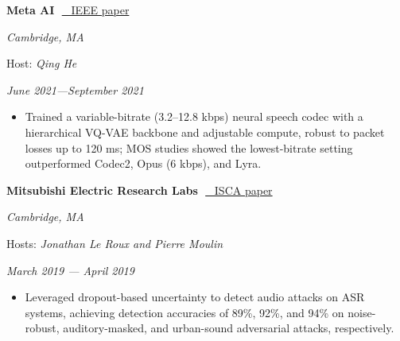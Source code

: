 \documentclass[10pt,margin,centered]{res}
\newcommand\quelle[1]{{%
      \unskip\nobreak\hfil\penalty50
      \hbox{}\nobreak\hfil\emph{#1}%
      \parfillskip=0pt \finalhyphendemerits=0 \par}}
\begin{document}
\begin{resume}
{\bf Meta AI} \,\,\href{https://ieeexplore.ieee.org/document/9747419}{\color{blue} \small
\faFilePdfO\ IEEE paper}\quelle{Cambridge, MA}
\vspace{-4mm}
Host: \textit{Qing He }\quelle{June 2021---September 2021}
\begin{itemize}
    \item Trained a variable-bitrate (3.2--12.8 kbps) neural speech codec with a hierarchical VQ-VAE backbone and adjustable compute, robust to packet losses up to 120 ms; MOS studies showed the lowest-bitrate setting outperformed Codec2, Opus (6 kbps), and Lyra.
\end{itemize}
\vspone


{\bf Mitsubishi Electric Research Labs} \,\,\href{https://arxiv.org/pdf/2006.01906}{\color{blue} \small
\faFilePdfO\ ISCA paper}\quelle{Cambridge, MA}
\vspace{-4mm}
Hosts: \textit{Jonathan Le Roux and Pierre Moulin }\quelle{March 2019 --- April 2019}
\begin{itemize}
\item Leveraged dropout-based uncertainty to detect audio attacks on ASR systems, achieving detection accuracies of 89\%, 92\%, and 94\% on noise-robust, auditory-masked, and urban-sound adversarial attacks, respectively.
\end{itemize}
\vspone
\vspace{-1mm}


\end{resume}
\end{document}
